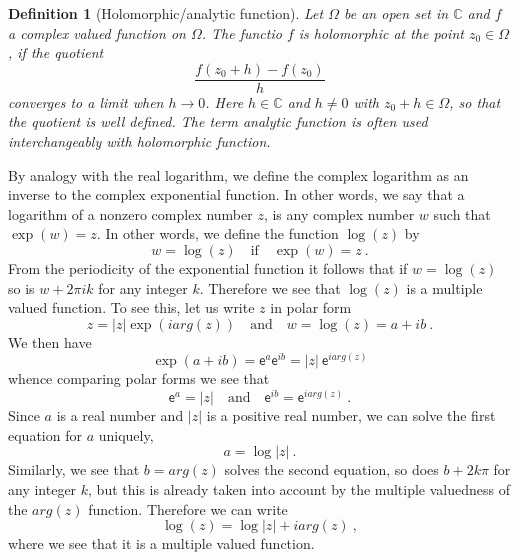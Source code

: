 \documentclass[10pt]{book}
\newcommand{\abs}[1]{\left|#1\right|}
\newcommand{\Cbb}{\mathbb{C}}
\newcommand{\esf}{\mathsf{e}}
\theoremstyle{break}
\newtheorem{definition}{Definition}
\begin{document}
\begin{definition}[Holomorphic/analytic function]
 Let $\Omega$ be an open set in $\Cbb$ and $f$ a complex valued function on $\Omega$. The functio $f$ is holomorphic at the point $z_0 \in \Omega$, if the quotient
 \begin{equation*}
  \frac{f(z_0 + h) - f(z_0)}{h}
 \end{equation*}
 converges to a limit when $h \to 0$. Here $h\in \Cbb$ and $h\neq 0$ with $z_0 + h \in \Omega$, so that the quotient is well defined. The term analytic function is often used interchangeably with holomorphic function. 
\end{definition}



By analogy with the real logarithm, we define the complex logarithm as an inverse to the complex exponential function. In other words, we say that a logarithm of a nonzero complex number $z$, is any complex number $w$ such that $\exp(w) = z$. In other words, we define the function $\log(z)$ by
\begin{equation*}
 w = \log(z) \quad \text{if} \quad \exp(w) = z \ .
\end{equation*}
From the periodicity of the exponential function it follows that if $w = \log(z)$ so is $w + 2 \pi i k$ for any integer $k$. Therefore we see that $\log(z)$ is a multiple valued function. To see this, let us write $z$ in polar form 
\begin{equation*}
 z = \abs{z} \exp(i arg(z)) \quad \text{and} \quad w = \log(z) = a + i b \ . 
\end{equation*}
We then have 
\begin{equation*}
 \exp(a + i b) = \esf^a \esf^{ib} = \abs{z} \ \esf^{i arg(z)}
\end{equation*}
whence comparing polar forms we see that
\begin{equation*}
 \esf^a = \abs{z} \quad \text{and} \quad \esf^{ib} = \esf^{iarg(z)} \ .
\end{equation*}
Since $a$ is a real number and $\abs{z}$ is a positive real number, we can solve the first equation for $a$ uniquely,
\begin{equation*}
 a = \log\abs{z} \ .
\end{equation*}
Similarly, we see that $b = arg(z)$ solves the second equation, so does $b +2 k \pi$ for any integer $k$, but this is already taken into account by the multiple valuedness of the $arg(z)$ function. Therefore we can write
\begin{equation*}
 \log(z) = \log\abs{z} + i arg(z) \ ,
\end{equation*}
where we see that it is a multiple valued function. \par
\end{document}
